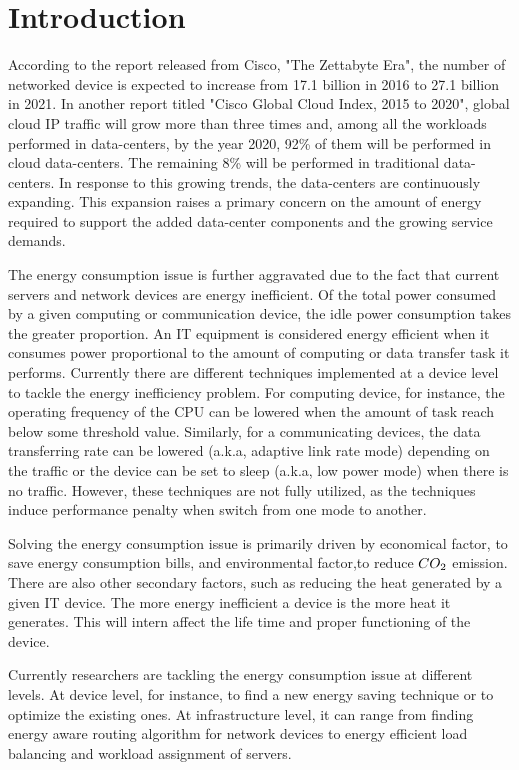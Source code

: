 \chapter{Introduction}
\label{chapter:intro}
According to the report released from Cisco, "The Zettabyte Era", the number of networked device is expected to increase from 17.1 billion in 2016 to 27.1 billion in 2021. In another report titled "Cisco Global Cloud Index, 2015 to 2020", global cloud IP traffic will grow more than three times and, among all the workloads performed in data-centers, by the year 2020, 92\% of them will be performed in cloud data-centers. The remaining 8\% will be performed in traditional data-centers. In response to this growing trends, the data-centers are continuously expanding. This expansion raises a primary concern on the amount of energy required to support the added data-center components and the growing service demands. 

The energy consumption issue is further aggravated due to the fact that current servers and network devices are energy inefficient. Of the total power consumed by a given computing or communication device, the idle power consumption takes the greater proportion. An IT equipment is considered energy efficient when it consumes power proportional to the amount of computing or data transfer task it performs. Currently there are different techniques implemented at a device level to tackle the energy inefficiency problem. For computing device, for instance, the operating frequency of the CPU can be lowered when the amount of task reach below some threshold value. Similarly, for a communicating devices, the data transferring rate can be lowered (a.k.a, adaptive link rate mode) depending on the traffic or the device can be set to sleep (a.k.a, low power mode) when there is no traffic. However, these techniques are not fully utilized, as the techniques induce performance penalty when switch from one mode to another.  

Solving the energy consumption issue is primarily driven by economical factor, to save energy consumption bills, and environmental factor,to reduce \($$CO_2$$\) emission. There are also other secondary factors, such as reducing the heat generated by a given IT device. The more energy inefficient a device is the more heat it generates. This will intern affect the life time and proper functioning of the device. 

Currently researchers are tackling the energy consumption issue at different levels. At device level, for instance, to find a new  energy saving technique or to optimize the existing ones. At infrastructure level, it can range from finding energy aware routing algorithm for network devices to energy efficient load balancing and workload assignment of servers. 

